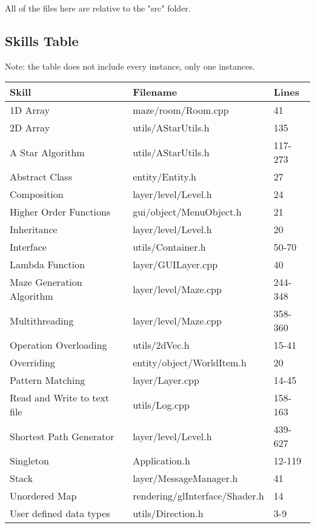 \documentclass[../Main.tex]{subfiles}
\begin{document}
All of the files here are relative to the "src" folder.
    \subsection{Skills Table}
        Note: the table does not include every instance, only one instances.
        \begin{center}
            \begin{tabular}{ | m{} | m{} | m{} | }
                \hline
                \textbf{Skill} & \textbf{Filename}  & \textbf{Lines} \\
                \hline
                1D Array & maze/room/Room.cpp & 41 \\
                \hline
                2D Array & utils/AStarUtils.h & 135 \\
                \hline
                A Star Algorithm & utils/AStarUtils.h & 117-273 \\
                \hline
                Abstract Class & entity/Entity.h & 27 \\
                \hline
                Composition & layer/level/Level.h & 24 \\
                \hline
                Higher Order Functions & gui/object/MenuObject.h & 21 \\
                \hline
                Inheritance & layer/level/Level.h & 20 \\
                \hline
                Interface & utils/Container.h & 50-70 \\
                \hline
                Lambda Function & layer/GUILayer.cpp & 40 \\
                \hline
                Maze Generation Algorithm & layer/level/Maze.cpp & 244-348 \\
                \hline
                Multithreading & layer/level/Maze.cpp & 358-360 \\
                \hline
                Operation Overloading & utils/2dVec.h & 15-41 \\
                \hline
                Overriding & entity/object/WorldItem.h & 20 \\
                \hline
                Pattern Matching & layer/Layer.cpp & 14-45 \\
                \hline
                Read and Write to text file & utils/Log.cpp & 158-163 \\
                \hline
                Shortest Path Generator & layer/level/Level.h & 439-627 \\
                \hline
                Singleton & Application.h & 12-119 \\
                \hline
                Stack & layer/MessageManager.h & 41 \\
                \hline
                Unordered Map & rendering/glInterface/Shader.h & 14 \\
                \hline
                User defined data types & utils/Direction.h & 3-9 \\
                \hline
            \end{tabular}
        \end{center}
\end{document}
